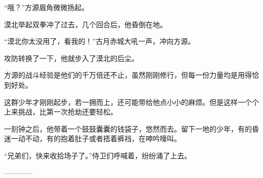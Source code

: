 \begin{this_body}
“哦？”方源眉角微微扬起。

漠北举起双拳冲了过去，几个回合后，他昏倒在地。

“漠北你太没用了，看我的！”古月赤城大吼一声，冲向方源。

攻防转换了一下，他就步入了漠北的后尘。

方源的战斗经验是他们的千万倍还不止，虽然刚刚修行，但每一份力量均是用得恰到好处。

这群少年才刚刚起步，若一拥而上，还可能带给他点小小的麻烦。但是这样一个个上来挑战，比第一次抢劫还要轻松。

一刻钟之后，他带着一个鼓鼓囊囊的钱袋子，悠然而去。留下一地的少年，有的昏迷一动不动，有的抱着肚子或者捂着裤裆，在呻吟嚎叫。

“兄弟们，快来收拾场子了。”侍卫们呼喊着，纷纷涌了上去。

------------

\end{this_body}

